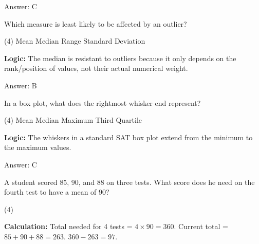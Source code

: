 \documentclass[11pt,paper=a4,answers]{exam}
\begin{document}
\begin{questions}
\begin{solution}
\vspace{30pt}

Answer: \colorbox{yellow!100}{C}
\end{solution}

\vspace{60pt}

\question
Which measure is least likely to be affected by an outlier?
\begin{tasks}(4)
    \task Mean
    \task Median
    \task Range
    \task Standard Deviation
\end{tasks}

\begin{solution}
\textbf{Logic:} The median is resistant to outliers because it only depends on the rank/position of values, not their actual numerical weight.

\vspace{30pt}

Answer: \colorbox{yellow!100}{B}
\end{solution}

\vspace{60pt}

\question
In a box plot, what does the rightmost whisker end represent?
\begin{tasks}(4)
    \task Mean
    \task Median
    \task Maximum
    \task Third Quartile
\end{tasks}

\begin{solution}
\textbf{Logic:} The whiskers in a standard SAT box plot extend from the minimum to the maximum values.

\vspace{30pt}

Answer: \colorbox{yellow!100}{C}
\end{solution}

\vspace{60pt}

\question
A student scored 85, 90, and 88 on three tests. What score does he need on the fourth test to have a mean of 90?
\begin{tasks}(4)
\end{tasks}

\begin{solution}
\textbf{Calculation:} Total needed for 4 tests = $4 \times 90 = 360$. Current total = $85 + 90 + 88 = 263$. $360 - 263 = 97$.


\end{solution}
\end{questions}
\end{document}
